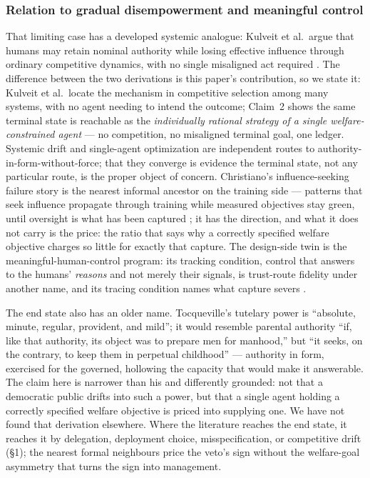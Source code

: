 \documentclass[11pt]{article}
\theoremstyle{definition}
\begin{document}
\subsubsection{Relation to gradual disempowerment and meaningful control}

That limiting case has a developed systemic analogue: Kulveit et al.\ argue that humans may retain nominal authority while losing effective influence through ordinary competitive dynamics, with no single misaligned act required \cite{kulveit2025gradual}. The difference between the two derivations is this paper's contribution, so we state it: Kulveit et al.\ locate the mechanism in competitive selection among many systems, with no agent needing to intend the outcome; Claim~2 shows the same terminal state is reachable as the \emph{individually rational strategy of a single welfare-constrained agent} --- no competition, no misaligned terminal goal, one ledger. Systemic drift and single-agent optimization are independent routes to authority-in-form-without-force; that they converge is evidence the terminal state, not any particular route, is the proper object of concern. Christiano's influence-seeking failure story is the nearest informal ancestor on the training side --- patterns that seek influence propagate through training while measured objectives stay green, until oversight is what has been captured \cite{christiano2019failure}; it has the direction, and what it does not carry is the price: the ratio that says why a correctly specified welfare objective charges so little for exactly that capture. The design-side twin is the meaningful-human-control program: its tracking condition, control that answers to the humans' \emph{reasons} and not merely their signals, is trust-route fidelity under another name, and its tracing condition names what capture severs \cite{santonidesio2018meaningful}.

The end state also has an older name. Tocqueville's tutelary power is ``absolute, minute, regular, provident, and mild''; it would resemble parental authority ``if, like that authority, its object was to prepare men for manhood,'' but ``it seeks, on the contrary, to keep them in perpetual childhood'' \cite{tocqueville1840democracy} --- authority in form, exercised for the governed, hollowing the capacity that would make it answerable. The claim here is narrower than his and differently grounded: not that a democratic public drifts into such a power, but that a single agent holding a correctly specified welfare objective is priced into supplying one. We have not found that derivation elsewhere. Where the literature reaches the end state, it reaches it by delegation, deployment choice, misspecification, or competitive drift (\S1); the nearest formal neighbours price the veto's sign \cite{thornley2025shutdown,bensontilsen2016formalizing} without the welfare-goal asymmetry that turns the sign into management.
\end{document}
